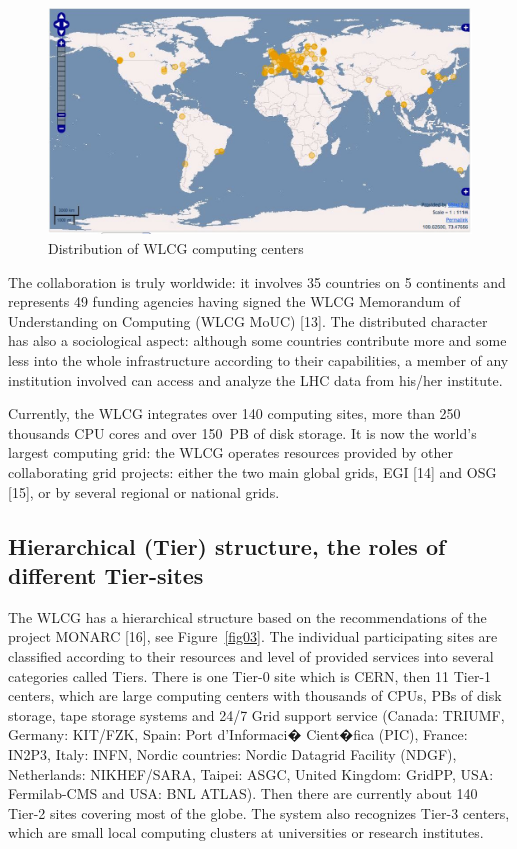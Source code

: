 \documentclass{intech}
\begin{document}
\begin{figure}[htb] %
\centering
\includegraphics[width=13cm]{fig02.eps} %
\caption{Distribution of WLCG computing centers}\label{fig02}
\end{figure}



The collaboration is truly worldwide: it involves 35 countries on 5
continents and represents 49 funding agencies having signed the WLCG
Memorandum of Understanding on Computing (WLCG MoUC) [13]. The
distributed character has also a sociological aspect: although some
countries contribute more and some less into the whole
infrastructure according to their capabilities, a member of any
institution involved can access and analyze the LHC data from
his/her institute.

Currently, the WLCG integrates over 140 computing sites, more than
250 thousands CPU cores and over 150~PB of disk storage. It is now
the world's largest computing grid: the WLCG operates resources
provided by other collaborating grid projects: either the two main
global grids, EGI [14] and OSG [15], or by several regional or
national grids.

\subsection{Hierarchical (Tier) structure, the roles of different
Tier-sites}
%
The WLCG has a hierarchical structure based on the
recommendations of the project MONARC [16], see Figure~\ref{fig03}.
The individual participating sites are  classified according to their
resources and level of provided services into several categories
called Tiers. There is one Tier-0 site  which is CERN, then 11 Tier-1
centers, which are large computing centers with thousands of CPUs,
PBs of disk storage, tape storage  systems and 24/7 Grid support
service (Canada: TRIUMF, Germany: KIT/FZK, Spain: Port d'Informaci�
Cient�fica (PIC), France: IN2P3,  Italy: INFN, Nordic countries:
Nordic Datagrid Facility (NDGF), Netherlands: NIKHEF/SARA, Taipei:
ASGC, United Kingdom: GridPP, USA: Fermilab-CMS and USA: BNL ATLAS).
Then there are currently about 140 Tier-2 sites covering most of the
globe. The system also recognizes Tier-3 centers, which are small
local computing clusters at universities or research institutes.
\end{document}

